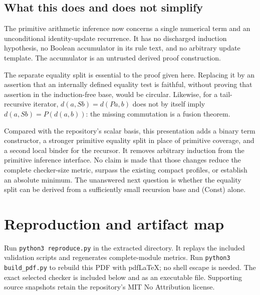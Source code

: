 \documentclass[11pt]{article}
\theoremstyle{definition}\newtheorem{definition}[theorem]{Definition}
\begin{document}
\subsection{What this does and does not simplify}

The primitive arithmetic inference now concerns a single numerical term
and an unconditional identity-update recurrence.  It has no discharged
induction hypothesis, no Boolean accumulator in its rule text, and no
arbitrary update template.  The accumulator is an untrusted derived
proof construction.

The separate equality split is essential to the proof given here.
Replacing it by an assertion that an internally defined equality test
is faithful, without proving that assertion in the induction-free base,
would be circular.  Likewise, for a tail-recursive iterator,
$d(a,Sb)=d(Pa,b)$ does not by itself imply
$d(a,Sb)=P(d(a,b))$: the missing commutation is a fusion theorem.

Compared with the repository's scalar basis, this presentation adds a
binary term constructor, a stronger primitive equality split in place
of primitive coverage, and a second local binder for the recursor.
It removes arbitrary induction from the primitive inference interface.
No claim is made that those changes reduce the complete checker-size
metric, surpass the existing compact profiles, or establish an absolute
minimum.  The unanswered next question is whether the equality split
can be derived from a sufficiently small recursion base and
\textup{(Const)} alone.


\section{Reproduction and artifact map}

Run \texttt{python3 reproduce.py} in the extracted directory. It
replays the included validation scripts and regenerates complete-module
metrics. Run \texttt{python3 build\_pdf.py} to rebuild this PDF with
pdfLaTeX; no shell escape is needed. The exact selected checker is
included below and as an executable file. Supporting source snapshots
retain the repository's MIT No Attribution license.
\end{document}
